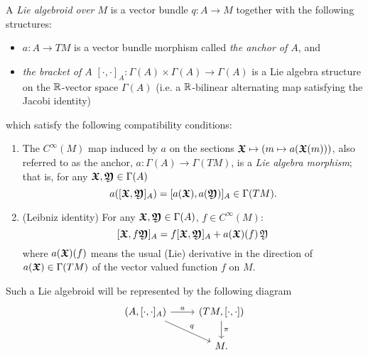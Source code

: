 \begin{definition} \label{defnLieAlgoid}
A \emph{Lie algebroid over $M$} is a vector bundle $q:A\to M$  together with the following structures:
    \begin{itemize}
    
    \item $a:A \to TM$ is a vector bundle morphism called \emph{the anchor of $A$}, and
    
    \item \emph{the bracket of $A$} $[\cdot, \cdot ]_A: \Gamma(A) \times \Gamma(A) \to \Gamma(A)$ is a Lie algebra structure on the $\mathbb{R}$-vector space $\Gamma(A)$ (i.e. a $\mathbb{R}$-bilinear alternating map satisfying the Jacobi identity)
 
    \end{itemize}  
which satisfy the following compatibility conditions:
    \begin{enumerate}
    
    \item The $C^\infty(M)$ map induced by $a$ on the sections $\bm{\mathfrak{X}} \mapsto (m \mapsto a(\bm{\mathfrak{X}}(m)))$, also referred to as the anchor, $a:\Gamma(A) \to \Gamma(TM)$, is a \emph{Lie algebra morphism}; that is, for any $\bm{\mathfrak{X}}, \bm{\mathfrak{Y}} \in \Gamma(A)$ \[ a([\bm{\mathfrak{X}}, \bm{\mathfrak{Y}}]_A)  = [a(\bm{\mathfrak{X}}), a(\bm{\mathfrak{Y}})]_A \in  \Gamma(TM).\]
    
    \item (Leibniz identity) For any $\bm{\mathfrak{X}}, \bm{\mathfrak{Y}} \in \Gamma(A)$, $f \in C^\infty (M)$: \[ [\bm{\mathfrak{X}}, f\bm{\mathfrak{Y}}]_A = f[\bm{\mathfrak{X}}, \bm{\mathfrak{Y}}]_A + a(\bm{\mathfrak{X}})(f)\, \mathfrak{Y} \] where $a(\bm{\mathfrak{X}})(f)$ means the usual (Lie) derivative in the direction of $a(\bm{\mathfrak{X}}) \in \Gamma(TM)$ of the vector valued function $f$ on $M$.
    
    \end{enumerate}
Such a Lie algebroid will be represented by the following diagram
\begin{equation}
    \begin{tikzcd}
    (A, [\cdot, \cdot]_A) \arrow{r}{a} \arrow{dr}{q} & (TM, [\cdot, \cdot]) \arrow{d}{\pi}\\
    & M.
    \end{tikzcd}
\end{equation}
\end{definition}



